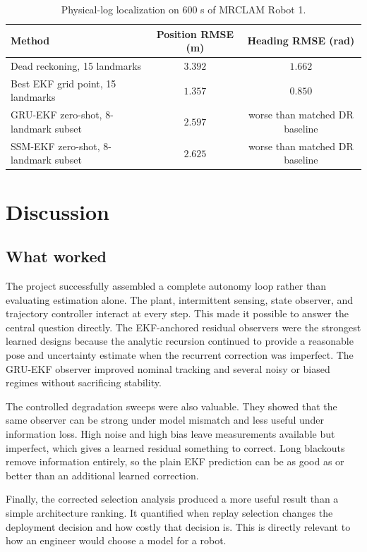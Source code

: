\documentclass[11pt]{article}
\begin{document}
\begin{table}[H]
\centering
\caption{Physical-log localization on 600 s of MRCLAM Robot 1.}
\label{tab:mrclam}
\begin{tabular}{lcc}
\toprule
Method & Position RMSE (m) & Heading RMSE (rad) \\
\midrule
Dead reckoning, 15 landmarks & $3.392$ & $1.662$ \\
Best EKF grid point, 15 landmarks & $\mathbf{1.357}$ & $\mathbf{0.850}$ \\
GRU-EKF zero-shot, 8-landmark subset & $2.597$ & worse than matched DR baseline \\
SSM-EKF zero-shot, 8-landmark subset & $2.625$ & worse than matched DR baseline \\
\bottomrule
\end{tabular}
\end{table}

\section{Discussion}
\subsection{What worked}
The project successfully assembled a complete autonomy loop rather than evaluating estimation alone. The plant, intermittent sensing, state observer, and trajectory controller interact at every step. This made it possible to answer the central question directly. The EKF-anchored residual observers were the strongest learned designs because the analytic recursion continued to provide a reasonable pose and uncertainty estimate when the recurrent correction was imperfect. The GRU-EKF observer improved nominal tracking and several noisy or biased regimes without sacrificing stability.

The controlled degradation sweeps were also valuable. They showed that the same observer can be strong under model mismatch and less useful under information loss. High noise and high bias leave measurements available but imperfect, which gives a learned residual something to correct. Long blackouts remove information entirely, so the plain EKF prediction can be as good as or better than an additional learned correction.

Finally, the corrected selection analysis produced a more useful result than a simple architecture ranking. It quantified when replay selection changes the deployment decision and how costly that decision is. This is directly relevant to how an engineer would choose a model for a robot.
\end{document}
